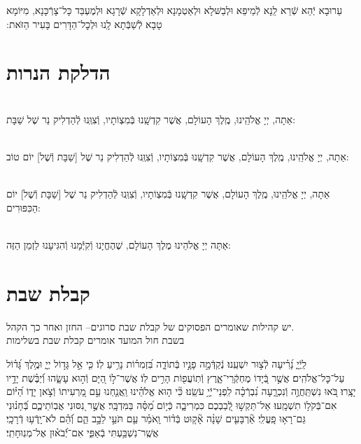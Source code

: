 \documentclass[twoside, openany, parskip=half, 11pt]{book}
\begin{document}
עֵרוּבָא יְֿהֵא שְֿׁרֵא לַֽנָא לְֿמֵיפֵא וּלְבַשּּׁלָא וּלְאַטְמָנָא וּלְאַדְלָקָא שְֿׁרָגָא וּלְמֶעְבַּד כָּל־צָרְֿכָּנָא, מִיּוֹמָא טָבָא לְֿשַׁבְּֿתָא לָֽנוּ וּלְכׇל־הַדָּרִים בָּעִיר הַזּׂאת:‏


\vspace{\baselineskip}
{\let\clearpage\relax
\chapter[הדלקת הנרות שבת ויום טוב]{ הדלקת הנרות }}

\\
אַתָה, יְיָ אֱלֹהֵֽינוּ, מֶֽלֶךְ הָעוֹלָם, אֲשֶׁר קִדְשָֽׁנוּ בְּֿמִצְוֹתָיו, וְֿצִוְּֽנוּ לְֿהַדְלִיק נֵר שֶׁל שַׁבָּת:

\\
אַתָה, יְיָ אֱלֹהֵֽינוּ, מֶֽלֶךְ הָעוֹלָם, אֲשֶׁר קִדְשָֽׁנוּ בְּֿמִצְוֹתָיו, וְֿצִוְּֽנוּ לְֿהַדְלִיק נֵר שֶׁל
[שַׁבָּת וְֿשֶׁל] יוֹם טוֹב:

\\
אַתָה, יְיָ אֱלֹהֵֽינוּ, מֶֽלֶךְ הָעוֹלָם, אֲשֶׁר קִדְשָֽׁנוּ בְּֿמִצְוֹתָיו, וְֿצִוְּֽנוּ לְֿהַדְלִיק נֵר שֶׁל
[שַׁבָּת וְֿשֶׁל] יוֹם הַכִּפּוּרִים:

\\
אַתָּה יְיָ אֱלֹהֵינוּ מֶלֶךְ הָעוֹלָם, שֶׁהֶחֱיָנוּ וְֿקִיְּֿֿמָנוּ וְֿהִגִּיעָנוּ לַזְמַן הַזֶּה:



\chapter[קבלת שבת]{ קבלת שבת }
\label{kabalas_shabbos}


\begin{scriptsize}
\textsf{יש קהילות שאומרים הפסוקים של קבלת שבת סרוגים-- החזן ואחר כך הקהל.\\
בשבת חול המועד אומרים קבלת שבת בשלימות}

\end{scriptsize}

לַֽיְֿיָ֑ נָ֝רִ֗יעָה לְֿצ֣וּר יִשְׁעֵֽנוּ׃
נְֿקַדְּֿמָ֣ה פָנָ֣יו בְּֿתוֹדָ֑ה בִּ֝זְמִר֗וֹת נָרִ֥יעַ לֽוֹ׃
כִּ֤י אֵ֣ל גָּד֣וֹל יְיָ֑ וּמֶ֥לֶךְ גָּ֝ד֗וֹל עַל־כׇּל־אֱלֹהִֽים׃
אֲשֶׁ֣ר בְּֿ֭יָדוֹ מֶחְקְֿרֵי־אָ֑רֶץ וְֿתֽוֹעֲפ֖וֹת הָרִ֣ים לֽוֹ׃
אֲשֶׁר־ל֣וֹ הַ֭יָּם וְֿה֣וּא עָשָׂ֑הוּ וְֿ֝יַבֶּ֗שֶׁת יָדָ֥יו יָצָֽרוּ׃
בֹּ֭אוּ נִשְׁתַּֽחֲוֶ֣ה וְֿנִכְרָ֑עָה נִ֝בְרְֿכָ֗ה לִֽפְנֵי־יְֿיָ֥ עֹשֵֽׂנוּ׃
כִּ֘י ה֤וּא אֱלֹהֵ֗ינוּ וַֽאֲנַ֤חְנוּ עַ֣ם מַ֭רְעִיתוֹ וְֿצֹ֣אן יָד֑וֹ הַ֝יּ֗וֹם אִם־בְּֿקֹל֥וֹ תִשְׁמָֽעוּ׃
אַל־תַּקְשׁ֣וּ לְֿ֭בַבְכֶם כִּמְרִיבָ֑ה כְּֿי֥וֹם מַ֝סָּ֗ה בַּמִּדְבָּֽר׃
אֲשֶׁ֣ר נִ֭סּוּנִי אֲבֽוֹתֵיכֶ֑ם בְּֿ֝חָנ֗וּנִי גַּם־רָא֥וּ פָֽעֳלִֽי׃
אַ֘רְבָּעִ֤ים שָׁנָ֨ה אָ֘ק֤וּט בְּֿד֗וֹר וָֽאֹמַ֗ר עַ֤ם תֹּעֵ֣י לֵבָ֣ב הֵ֑ם וְֿ֝הֵ֗ם לֹא־יָֽדְֿע֥וּ דְֿרָכָֽי׃
אֲשֶֽׁר־נִשְׁבַּ֥עְתִּי בְֿאַפִּ֑י אִם־יְֿ֝בֹא֗וּן אֶל־מְנֽוּחָתִֽי׃
\end{document}
